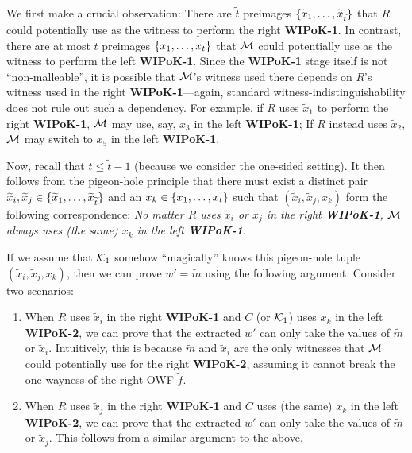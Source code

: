 We first make a crucial observation: There are $\tilde{t}$ preimages $\{\widetilde{x}_1, \ldots, \widetilde{x}_{\widetilde{t}}\}$ that $R$ could potentially use as the witness to perform the right {\bf WIPoK-1}. In contrast, there are at most $t$ preimages $\{x_1, \ldots, x_t\}$ that $\mathcal{M}$ could potentially use as the witness to perform the left {\bf WIPoK-1}. Since the {\bf WIPoK-1} stage itself is not ``non-malleable'', it is possible that $\mathcal{M}$'s witness used there depends on $R$'s witness used in the right {\bf WIPoK-1}---again, standard witness-indistinguishability does not rule out such a dependency. For example, if $R$ uses $\tilde{x}_1$ to perform the right {\bf WIPoK-1}, $\mathcal{M}$ may use, say, $x_3$ in the left {\bf WIPoK-1}; If $R$ instead uses $\tilde{x}_2$, $\mathcal{M}$ may switch to $x_5$ in the left {\bf WIPoK-1}. 

Now, recall that $t\le \tilde{t}-1$ (because we consider the one-sided setting). It then follows from the pigeon-hole principle that there must exist a distinct pair $\widetilde{x}_i, \widetilde{x}_j \in \{\widetilde{x}_1, \ldots, \widetilde{x}_{\widetilde{t}}\}$ and an $x_k\in\{x_1, \ldots, x_t\}$ such that $(\tilde{x}_i, \tilde{x}_j, x_k)$ form the following correspondence: {\em No matter $R$ uses $\tilde{x}_i$ or $\tilde{x_j}$ in the right {\bf WIPoK-1}, $\mathcal{M}$ always uses (the same) $x_k$ in the left {\bf WIPoK-1}}. 

If we assume that $\mathcal{K}_1$ somehow ``magically'' knows this pigeon-hole tuple $(\tilde{x}_i, \tilde{x}_j, x_k)$, then we can prove $w' = \tilde{m}$ using the following argument. Consider two scenarios:
 \begin{enumerate}
 \item
When $R$ uses $\tilde{x}_i$ in the right {\bf WIPoK-1} and $C$ (or $\mathcal{K}_1$) uses $x_k$ in the left {\bf WIPoK-2}, we can prove that the extracted $w'$ can only take the values of $\tilde{m}$ or $\tilde{x}_i$. Intuitively, this is because $\tilde{m}$ and $\tilde{x}_i$ are the only witnesses that $\mathcal{M}$ could potentially use for the right {\bf WIPoK-2}, assuming it cannot break the one-wayness of the right OWF $\tilde{f}$. %
\item
When $R$ uses $\tilde{x}_j$ in the right {\bf WIPoK-1} and $C$ uses (the same) $x_k$ in the left {\bf WIPoK-2}, we can prove that the extracted $w'$ can only take the values of $\tilde{m}$ or $\tilde{x}_j$. This follows from a similar argument to the above. 
\end{enumerate}  

